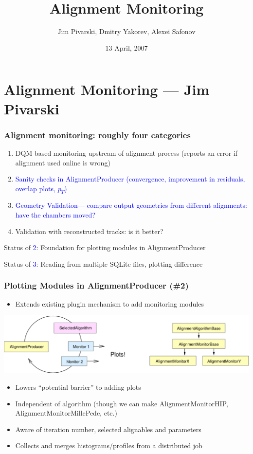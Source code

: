 \documentclass[compress]{beamer}
\title{Alignment Monitoring}
\author{Jim Pivarski, Dmitry Yakorev, Alexei Safonov}
\institute{Texas A\&M University}
\date{13 April, 2007}
\begin{document}
\frame{\titlepage}
\section*{Alignment Monitoring --- Jim Pivarski}

\begin{frame}
\frametitle{Alignment monitoring: roughly four categories}
\begin{enumerate}\setlength{\itemsep}{0.4 cm}
\item DQM-based monitoring upstream of alignment process (reports an error if alignment used online is wrong)
\item \textcolor{blue}{Sanity checks in AlignmentProducer (convergence, improvement in residuals, overlap plots, $p_T$)}
\item \textcolor{blue}{Geometry Validation--- compare output geometries from different alignments: have the chambers moved?}
\item Validation with reconstructed tracks: is it better?
\end{enumerate}

\vfill Status of \textcolor{blue}{2}: Foundation for plotting modules in AlignmentProducer

\vfill Status of \textcolor{blue}{3}: Reading from multiple SQLite files, plotting difference
\end{frame}

\begin{frame}
\frametitle{Plotting Modules in AlignmentProducer (\#2)}
\begin{itemize}
\item Extends existing plugin mechanism to add monitoring modules
\end{itemize}

\vfill
\includegraphics[width=\linewidth]{organization}

\vfill
\begin{itemize}\setlength{\itemsep}{0.25 cm}
\item Lowers ``potential barrier'' to adding plots
\item Independent of algorithm (though we can make AlignmentMonitorHIP, AlignmentMonitorMillePede, etc.)
\item Aware of iteration number, selected alignables and parameters
\item Collects and merges histograms/profiles from a distributed job
\end{itemize}
\end{frame}
\end{document}
